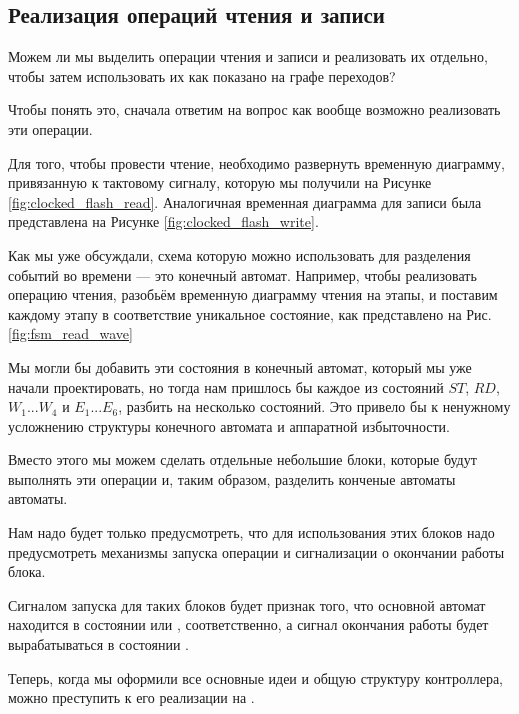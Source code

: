 \subsection{Реализация операций чтения и записи}
\par{Можем ли мы выделить операции чтения и записи и реализовать их отдельно, чтобы затем использовать их как показано на графе переходов?}
\par{Чтобы понять это, сначала ответим на вопрос как вообще возможно реализовать эти операции.}
\par{Для того, чтобы провести чтение, необходимо развернуть временную диаграмму, привязанную к тактовому сигналу, которую мы получили на Рисунке \ref{fig:clocked_flash_read}. Аналогичная временная диаграмма для записи была представлена на Рисунке \ref{fig:clocked_flash_write}.}
\par{Как мы уже обсуждали, схема которую можно использовать для разделения событий во времени --- это конечный автомат. Например, чтобы реализовать операцию чтения, разобьём временную диаграмму чтения на этапы, и поставим каждому этапу в соответствие уникальное состояние, как представлено на Рис. \ref{fig:fsm_read_wave}}
\par{Мы могли бы добавить эти состояния в конечный автомат, который мы уже начали проектировать, но тогда нам пришлось бы каждое из состояний $ST$, $RD$, $W_1 ... W_4$ и $E_1 ... E_6$, разбить на несколько состояний. Это привело бы к ненужному усложнению структуры конечного автомата и аппаратной избыточности.}
\par{Вместо этого мы можем сделать отдельные небольшие блоки, которые будут выполнять эти операции и, таким образом, разделить конченые автоматы автоматы.}
\par{Нам надо будет только предусмотреть, что для использования этих блоков надо предусмотреть механизмы запуска операции и сигнализации о окончании работы блока.}
\par{Сигналом запуска для таких блоков будет признак того, что основной автомат находится в состоянии  или , соответственно, а сигнал окончания работы будет вырабатываться в состоянии .}
\par{Теперь, когда мы оформили все основные идеи и общую структуру контроллера, можно преступить к его реализации на .}

